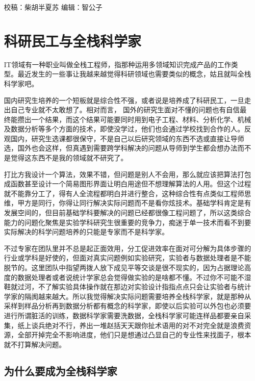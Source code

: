 \documentclass[
]{book}
\begin{document}
校稿：柴胡半夏苏
编辑：智公子

\hypertarget{ux79d1ux7814ux6c11ux5de5ux4e0eux5168ux6808ux79d1ux5b66ux5bb6}{%
\section{科研民工与全栈科学家}\label{ux79d1ux7814ux6c11ux5de5ux4e0eux5168ux6808ux79d1ux5b66ux5bb6}}

IT领域有一种职业叫做全栈工程师，指那种运用多领域知识完成产品的工作类型。最近发生的一些事让我越来越觉得科研领域也需要类似的概念，姑且就叫全栈科学家吧。

国内研究生培养的一个短板就是综合性不强，或者说是培养成了科研民工，一旦走出自己专业就不太敢想了。相对而言， 国外的研究生面对不懂的问题也有自信最终能攒出一个结果，而这个结果可能要同时用到电子工程、材料、分析化学、机械及数据分析等多个方面的技术，即使没学过，他们也会通过学校找到合作的人。反观国内，研究生选课都很保守，不是自己以后研究领域的东西不选或直接让导师选，国外也会这样，但真遇到需要跨学科解决的问题从导师到学生都会想办法而不是觉得这东西不是我的领域就不研究了。

打比方我设计一个算法，效果不错，但问题是别人不会用，那么就应该把算法打包成函数甚至设计一个简易图形界面让明白用途但不想理解算法的人用。但这个过程就不能靠分工了，得有人全流程都明白并进行整合，这种综合性有点类似工程师思维，甲方是同行，你得让同行解决实际问题而不是看你炫技术。基础学科肯定是有发展空间的，但目前基础学科要解决的问题已经都很像工程问题了，所以这类综合能力的问题化聚焦是实验学科研究生很重要的竞争力，痴迷于单一技术而看不到要实际解决的科学问题培养的只能是专家而不是科学家。

不过专家在团队里并不总是起正面效用，分工促进效率在面对可分解为具体步骤的行业或学科是好使的，但面对真实问题例如实验研究，实验者与数据处理者是不能脱节的。这里团队中指望两拨人放下成见平等交谈是很不现实的，因为占据理论高度的数据处理者或者说统计学家总会觉得做实验的是啥都不懂。不过你不可能不湿鞋就过河，不了解实验具体操作就在那边对实验设计指指点点只会让实验者与统计学家的隔阂越来越大。所以我觉得解决实际问题需要培养全栈科学家，就是那种从采样到样品分析再到数据分析都有概念的科学家，即使以后实验可以外包也必须要进行所谓脏活的训练，数据科学家需要洗数据，全栈科学家可能连样品都要亲自采集，纸上谈兵绝对不行，养出一堆赵括天天跟你扯术语用的对不对完全就是浪费资源，全部开掉完全不影响进度，他们只是想通过凸显自己的专业性来找面子，根本就不打算解决问题。

\hypertarget{ux4e3aux4ec0ux4e48ux8981ux6210ux4e3aux5168ux6808ux79d1ux5b66ux5bb6}{%
\subsection{为什么要成为全栈科学家}\label{ux4e3aux4ec0ux4e48ux8981ux6210ux4e3aux5168ux6808ux79d1ux5b66ux5bb6}}
\end{document}
